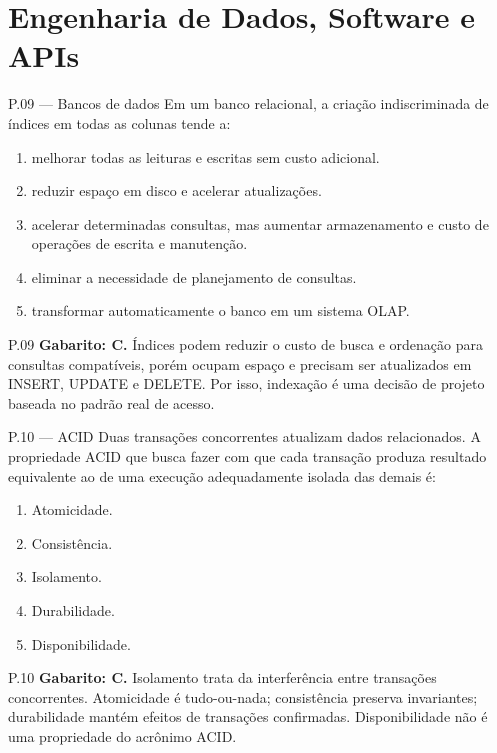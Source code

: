 \section{Engenharia de Dados, Software e APIs}

\begin{questao}{ P.09 — Bancos de dados}
Em um banco relacional, a criação indiscriminada de índices em todas as colunas tende a:
\begin{enumerate}[label=\Alph*)]
\item melhorar todas as leituras e escritas sem custo adicional.
\item reduzir espaço em disco e acelerar atualizações.
\item acelerar determinadas consultas, mas aumentar armazenamento e custo de operações de escrita e manutenção.
\item eliminar a necessidade de planejamento de consultas.
\item transformar automaticamente o banco em um sistema OLAP.
\end{enumerate}
\end{questao}
\begin{solucao}{P.09}
\textbf{Gabarito: C.} Índices podem reduzir o custo de busca e ordenação para consultas compatíveis, porém ocupam espaço e precisam ser atualizados em INSERT, UPDATE e DELETE. Por isso, indexação é uma decisão de projeto baseada no padrão real de acesso.
\end{solucao}

\begin{questao}{ P.10 — ACID}
Duas transações concorrentes atualizam dados relacionados. A propriedade ACID que busca fazer com que cada transação produza resultado equivalente ao de uma execução adequadamente isolada das demais é:
\begin{enumerate}[label=\Alph*)]
\item Atomicidade.
\item Consistência.
\item Isolamento.
\item Durabilidade.
\item Disponibilidade.
\end{enumerate}
\end{questao}
\begin{solucao}{P.10}
\textbf{Gabarito: C.} Isolamento trata da interferência entre transações concorrentes. Atomicidade é tudo-ou-nada; consistência preserva invariantes; durabilidade mantém efeitos de transações confirmadas. Disponibilidade não é uma propriedade do acrônimo ACID.
\end{solucao}

